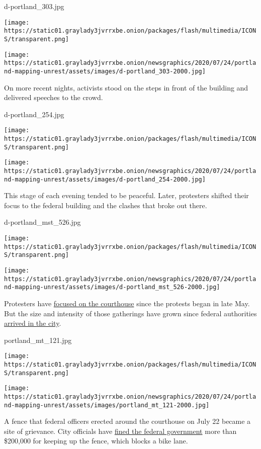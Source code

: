 d-portland\_303.jpg

\texttt{[image: https://static01.graylady3jvrrxbe.onion/packages/flash/multimedia/ICONS/transparent.png]}

\texttt{[image: https://static01.graylady3jvrrxbe.onion/newsgraphics/2020/07/24/portland-mapping-unrest/assets/images/d-portland\_303-2000.jpg]}

On more recent nights, activists stood on the steps in front of the
building and delivered speeches to the crowd.

d-portland\_254.jpg

\texttt{[image: https://static01.graylady3jvrrxbe.onion/packages/flash/multimedia/ICONS/transparent.png]}

\texttt{[image: https://static01.graylady3jvrrxbe.onion/newsgraphics/2020/07/24/portland-mapping-unrest/assets/images/d-portland\_254-2000.jpg]}

This stage of each evening tended to be peaceful. Later, protesters
shifted their focus to the federal building and the clashes that broke
out there.

d-portland\_mst\_526.jpg

\texttt{[image: https://static01.graylady3jvrrxbe.onion/packages/flash/multimedia/ICONS/transparent.png]}

\texttt{[image: https://static01.graylady3jvrrxbe.onion/newsgraphics/2020/07/24/portland-mapping-unrest/assets/images/d-portland\_mst\_526-2000.jpg]}

Protesters have
\href{https://www.youtube.com/watch?v=s1FnOvg62O0}{focused on the
courthouse} since the protests began in late May. But the size and
intensity of those gatherings have grown since federal authorities
\href{https://www.nytimes3xbfgragh.onion/2020/07/17/us/portland-protests.html}{arrived
in the city}.

portland\_mt\_121.jpg

\texttt{[image: https://static01.graylady3jvrrxbe.onion/packages/flash/multimedia/ICONS/transparent.png]}

\texttt{[image: https://static01.graylady3jvrrxbe.onion/newsgraphics/2020/07/24/portland-mapping-unrest/assets/images/portland\_mt\_121-2000.jpg]}

A fence that federal officers erected around the courthouse on July 22
became a site of grievance. City officials have
\href{https://twitter.com/ChloeEudalyPDX/status/1288163839037456385}{fined
the federal government} more than \$200,000 for keeping up the fence,
which blocks a bike lane.

